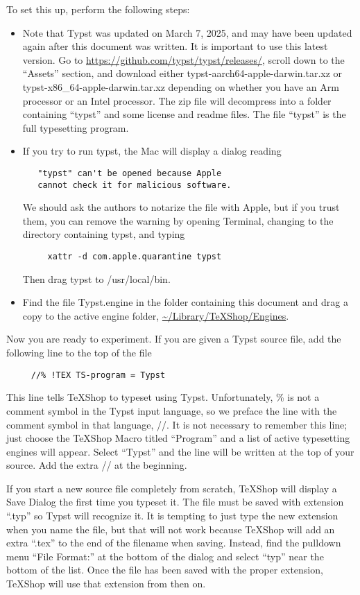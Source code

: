 \documentclass[11pt, oneside]{article}   	%
\begin{document}
To set this up, perform the following steps:
\begin{itemize}
\item Note that Typst was updated on March 7, 2025, and may have been updated again after this document was written. It is important to use this latest version. Go to  \url{https://github.com/typst/typst/releases/}, scroll down to the ``Assets'' section, and download either typst-aarch64-apple-darwin.tar.xz or typst-x86\_64-apple-darwin.tar.xz depending on whether you have an Arm processor or an Intel processor. The zip file will decompress into a folder containing  ``typst'' and some license and readme files. The file ``typst'' is the full typesetting program.
\item
If you try to run typst, the Mac will display a dialog reading
\begin{verbatim}
   "typst" can't be opened because Apple 
   cannot check it for malicious software.
\end{verbatim}
We should ask the authors to notarize the file with Apple, but if you trust them, you can remove the
warning by opening Terminal, changing to the directory containing typst, and typing
\begin{verbatim}
     xattr -d com.apple.quarantine typst
\end{verbatim}
Then drag typst to /usr/local/bin.
\item Find the file Typst.engine in the folder containing this document 
and drag a copy to the active engine folder, \url{~/Library/TeXShop/Engines}.
\end{itemize}
\vspace{.2 in}

Now you are ready to experiment. If you are given a Typst source file, add the following line to the top of the file
\begin{verbatim}
     //% !TEX TS-program = Typst
\end{verbatim}
This line tells TeXShop to typeset using Typst. Unfortunately, \% is not a comment symbol in the Typst input language, so we preface the line with the comment symbol in that language, //. It is not necessary to remember this line; just
choose the TeXShop Macro titled  ``Program'' and a list of active typesetting engines will appear. Select ``Typst'' and
the line will be written at the top of your source. Add the extra // at the beginning.

If  you start a new source file completely from scratch,  TeXShop will display a Save Dialog the first time you typeset it. The file must be saved with extension ``.typ'' so Typst will recognize it.  It is tempting to just type the new extension when you name the file, but that will not work because TeXShop will add an extra ``.tex'' to the end of the filename when saving. Instead, find the pulldown menu ``File Format:'' at the bottom of the dialog and select ``typ'' near the bottom of the list. Once the file has been saved with the proper extension, TeXShop will use that extension from then on. 
\end{document}
